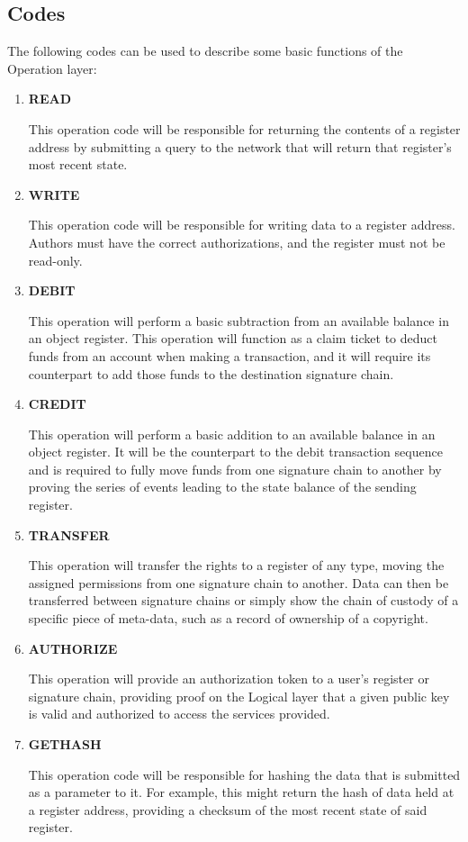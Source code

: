 \documentclass[11pt]{article}
\begin{document}
\subsection{Codes}

The following codes can be used to describe some basic functions of the Operation layer:

\begin{enumerate}
\item \textbf{READ}

This operation code will be responsible for returning the contents of a register address by submitting a query to the network that will return that register's most recent state.

\item \textbf{WRITE}

This operation code will be responsible for writing data to a register address. Authors must have the correct authorizations, and the register must not be read-only.

\item \textbf{DEBIT}

This operation will perform a basic subtraction from an available balance in an object register.
This operation will function as a claim ticket to deduct funds from an account when making a transaction, and it will require its counterpart to add those funds to the destination signature chain.

\item \textbf{CREDIT}

This operation will perform a basic addition to an available balance in an object register. It will be the counterpart to the debit transaction sequence and is required to fully move funds from one signature chain to another by proving the series of events leading to the state balance of the sending register.

\item \textbf{TRANSFER}

This operation will transfer the rights to a register of any type, moving the assigned permissions from one signature chain to another.
Data can then be transferred between signature chains or simply show the chain of custody of a specific piece of meta-data, such as a record of ownership of a copyright.

\item \textbf{AUTHORIZE}

This operation will provide an authorization token to a user's register or signature chain, providing proof on the Logical layer that a given public key is valid and authorized to access the services provided.

\item \textbf{GETHASH}

This operation code will be responsible for hashing the data that is submitted as a parameter to it.
For example, this might return the hash of data held at a register address, providing a checksum of the most recent state of said register.

\end{enumerate}
\end{document}
